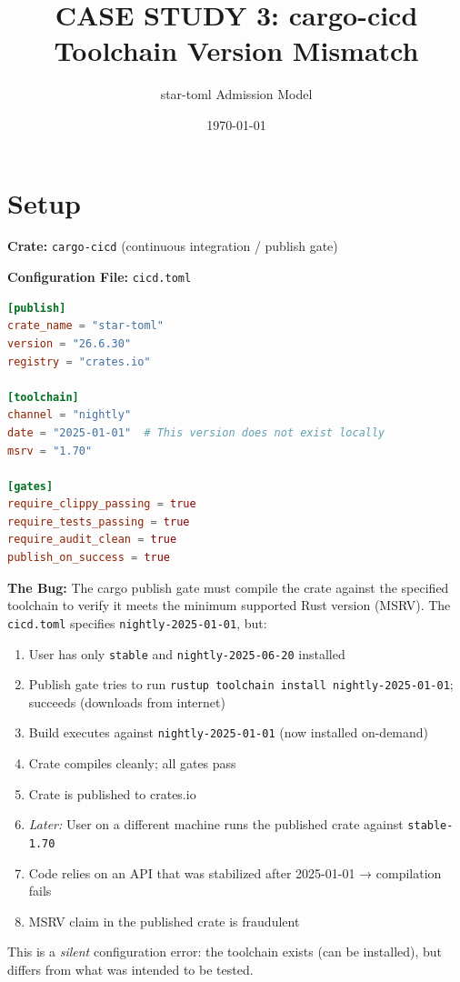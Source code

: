 \documentclass[11pt,a4paper]{article}
\title{CASE STUDY 3: cargo-cicd Toolchain Version Mismatch}
\author{star-toml Admission Model}
\date{\today}
\begin{document}
\maketitle

\section*{Setup}

\textbf{Crate:} \texttt{cargo-cicd} (continuous integration / publish gate)

\textbf{Configuration File:} \texttt{cicd.toml}
\begin{lstlisting}[language=toml]
[publish]
crate_name = "star-toml"
version = "26.6.30"
registry = "crates.io"

[toolchain]
channel = "nightly"
date = "2025-01-01"  # This version does not exist locally
msrv = "1.70"

[gates]
require_clippy_passing = true
require_tests_passing = true
require_audit_clean = true
publish_on_success = true
\end{lstlisting}

\textbf{The Bug:} The cargo publish gate must compile the crate against the specified toolchain to verify it meets the minimum supported Rust version (MSRV). The \texttt{cicd.toml} specifies \texttt{nightly-2025-01-01}, but:

\begin{enumerate}
  \item User has only \texttt{stable} and \texttt{nightly-2025-06-20} installed
  \item Publish gate tries to run \texttt{rustup toolchain install nightly-2025-01-01}; succeeds (downloads from internet)
  \item Build executes against \texttt{nightly-2025-01-01} (now installed on-demand)
  \item Crate compiles cleanly; all gates pass
  \item Crate is published to crates.io
  \item \emph{Later:} User on a different machine runs the published crate against \texttt{stable-1.70}
  \item Code relies on an API that was stabilized after 2025-01-01 → compilation fails
  \item MSRV claim in the published crate is fraudulent
\end{enumerate}

This is a \emph{silent} configuration error: the toolchain exists (can be installed), but differs from what was intended to be tested.
\end{document}
